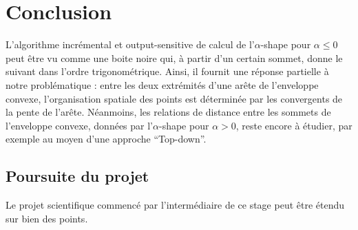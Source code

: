 \section{Conclusion}


L'algorithme incrémental et output-sensitive de calcul de l'$\alpha$-shape pour $\alpha \leq 0$ peut être vu comme une boite noire qui, à partir d'un certain sommet, donne le suivant dans l'ordre trigonométrique. Ainsi, il fournit une réponse partielle à notre problématique : entre les deux extrémités d'une arête de l'enveloppe convexe, l'organisation spatiale des points est déterminée par les convergents de la pente de l'arête. Néanmoins, les relations de distance entre les sommets de l'enveloppe convexe, données par l'$\alpha$-shape pour $\alpha > 0$, reste encore à étudier, par exemple au moyen d'une approche ``Top-down''.


\subsection{Poursuite du projet}

Le projet scientifique commencé par l'intermédiaire de ce stage peut être étendu sur bien des points. 

